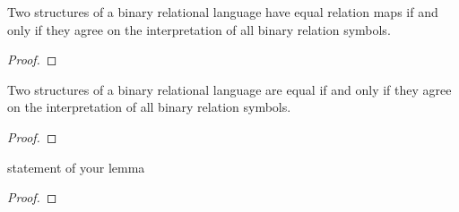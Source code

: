 

\begin{lemma}
    \label{lem:structure-relmap-binary-relational-language}
    \leanok
    Two structures of a binary relational language have equal relation maps if and only 
    if they agree on the interpretation of all binary relation symbols.
\end{lemma}
\begin{proof}
    \leanok
\end{proof}

\begin{lemma}
    \label{lem:equality-of-structures-binary-relational-language}
    \leanok
    Two structures of a binary relational language are equal if and only if they agree on the 
    interpretation of all binary relation symbols.
\end{lemma}
\begin{proof}
    \leanok
\end{proof}

\begin{lemma}
    \label{lem:orders-coincide-for-ordered-structures}
    \leanok
    statement of your lemma
\end{lemma}
\begin{proof}
    \leanok
\end{proof}


